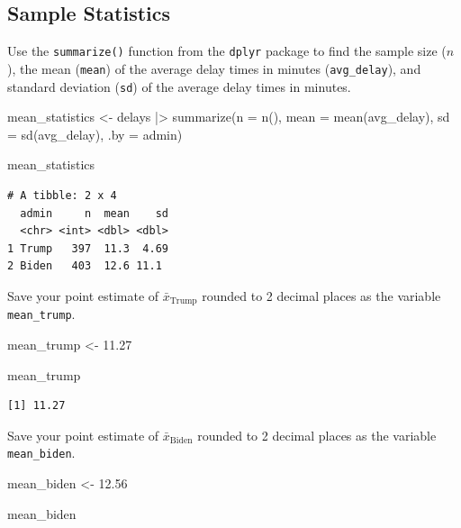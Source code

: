 \documentclass[
  letterpaper,
  DIV=11,
  numbers=noendperiod]{scrartcl}
\newenvironment{Shaded}{\begin{snugshade}}{\end{snugshade}}
\newcommand{\AttributeTok}[1]{\textcolor[rgb]{0.40,0.45,0.13}{#1}}
\newcommand{\FloatTok}[1]{\textcolor[rgb]{0.68,0.00,0.00}{#1}}
\newcommand{\FunctionTok}[1]{\textcolor[rgb]{0.28,0.35,0.67}{#1}}
\newcommand{\NormalTok}[1]{\textcolor[rgb]{0.00,0.23,0.31}{#1}}
\newcommand{\OtherTok}[1]{\textcolor[rgb]{0.00,0.23,0.31}{#1}}
\newcommand{\SpecialCharTok}[1]{\textcolor[rgb]{0.37,0.37,0.37}{#1}}
\newcommand{\StringTok}[1]{\textcolor[rgb]{0.13,0.47,0.30}{#1}}
\begin{document}
\subsection{Sample Statistics}\label{sample-statistics-1}

Use the \texttt{summarize()} function from the \texttt{dplyr} package to
find the sample size (\(n\)), the mean (\texttt{mean}) of the average
delay times in minutes (\texttt{avg\_delay}), and standard deviation
(\texttt{sd}) of the average delay times in minutes.

\begin{Shaded}
\begin{Highlighting}[]
\NormalTok{mean\_statistics }\OtherTok{\textless{}{-}}\NormalTok{ delays }\SpecialCharTok{|\textgreater{}}
  \FunctionTok{summarize}\NormalTok{(}\AttributeTok{n =} \FunctionTok{n}\NormalTok{(), }
            \AttributeTok{mean =} \FunctionTok{mean}\NormalTok{(avg\_delay), }
            \AttributeTok{sd =} \FunctionTok{sd}\NormalTok{(avg\_delay),}
            \AttributeTok{.by =} \StringTok{\textquotesingle{}admin\textquotesingle{}}\NormalTok{)}

\NormalTok{mean\_statistics }
\end{Highlighting}
\end{Shaded}

\begin{verbatim}
# A tibble: 2 x 4
  admin     n  mean    sd
  <chr> <int> <dbl> <dbl>
1 Trump   397  11.3  4.69
2 Biden   403  12.6 11.1 
\end{verbatim}

Save your point estimate of \(\bar{x}_{\text{Trump}}\) rounded to 2
decimal places as the variable \texttt{mean\_trump}.

\begin{Shaded}
\begin{Highlighting}[]
\NormalTok{mean\_trump }\OtherTok{\textless{}{-}} \FloatTok{11.27}

\NormalTok{mean\_trump}
\end{Highlighting}
\end{Shaded}

\begin{verbatim}
[1] 11.27
\end{verbatim}

Save your point estimate of \(\bar{x}_{\text{Biden}}\) rounded to 2
decimal places as the variable \texttt{mean\_biden}.

\begin{Shaded}
\begin{Highlighting}[]
\NormalTok{mean\_biden }\OtherTok{\textless{}{-}} \FloatTok{12.56}

\NormalTok{mean\_biden}
\end{Highlighting}
\end{Shaded}
\end{document}
